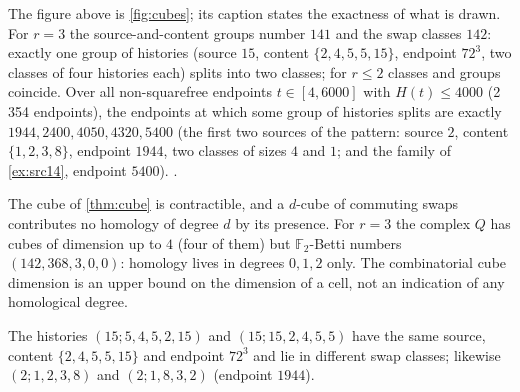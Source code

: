 \noindent The figure above is \cref{fig:cubes}; its caption states the exactness of what is drawn.
For $r=3$ the source-and-content groups number $141$ and the swap classes $142$: exactly one group of histories (source $15$, content $\{2,4,5,5,15\}$, endpoint $72^3$, two classes of four histories each) splits into two classes; for $r\le2$ classes and groups coincide. Over all non-squarefree endpoints $t\in[4,6000]$ with $H(t)\le4000$ (2\,354 endpoints), the endpoints at which some group of histories splits are exactly $1944,2400,4050,4320,5400$ (the first two sources of the pattern: source $2$, content $\{1,2,3,8\}$, endpoint $1944$, two classes of sizes $4$ and $1$; and the family of \cref{ex:src14}, endpoint $5400$). .
\begin{remark}\label{rem:cubedeg}
The cube of \cref{thm:cube} is contractible, and a $d$-cube of commuting swaps contributes no homology of degree $d$ by its presence. For $r=3$ the complex $Q$ has cubes of dimension up to $4$ (four of them) but $\mathbb F_2$-Betti numbers $(142,368,3,0,0)$: homology lives in degrees $0,1,2$ only. The combinatorial cube dimension is an upper bound on the dimension of a cell, not an indication of any homological degree.
\end{remark}
\begin{proposition}\label{prop:splitgroup}
The histories $(15;5,4,5,2,15)$ and $(15;15,2,4,5,5)$ have the same source, content $\{2,4,5,5,15\}$ and endpoint $72^3$ and lie in different swap classes; likewise $(2;1,2,3,8)$ and $(2;1,8,3,2)$ (endpoint $1944$).
\end{proposition}

